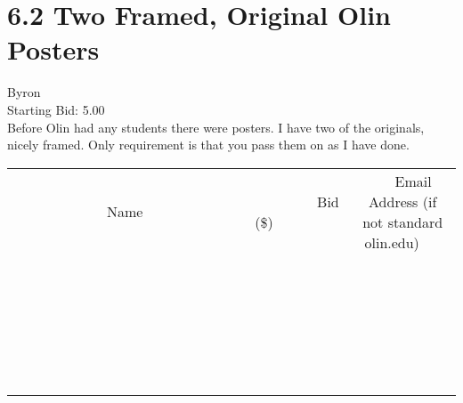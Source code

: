 \documentclass[11pt]{article}
\begin{document}
					\section*{6.2 Two Framed, Original Olin Posters}
					Byron \\
					Starting Bid: 5.00 \\
					Before Olin had any students there were posters. I have two of the originals, nicely framed. Only requirement is that you pass them on as I have done. \\
					[6ex]
					\begin{tabular}{c c c}
						~~~~~~~~~~~~~Name~~~~~~~~~~~~~ & ~~~~~~~~~Bid (\$)~~~~~~~~~ & ~~~Email Address (if not standard olin.edu)~~~ \\
				
 & & \\
\hline
 & & \\
\hline
 & & \\
\hline
 & & \\
\hline
 & & \\
\hline
 & & \\
\hline
 & & \\
\hline
 & & \\
\hline
 & & \\
\hline
 & & \\
\hline
 & & \\
\hline
 & & \\
\hline
 & & \\
\hline
 & & \\
\hline
 & & \\
\hline
 & & \\
\hline
 & & \\
\hline
 & & \\
\hline
 & & \\
\hline
 & & \\
\hline
 & & \\
\hline
 & & \\
\hline
 & & \\
\hline
 & & \\
\hline
 & & \\
\hline
 & & \\
\hline
					\end{tabular}
					\clearpage
				
\end{document}
